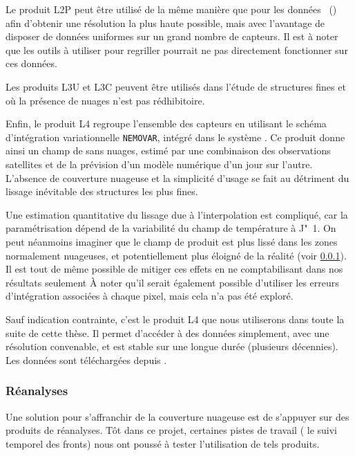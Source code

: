 Le produit L2P peut être utilisé de la même manière que pour les données ~() afin d'obtenir une résolution la plus haute possible, mais avec l'avantage de disposer de données uniformes sur un grand nombre de capteurs.
Il est à noter que les outils à utiliser pour regriller pourrait ne pas directement fonctionner sur ces données.

Les produits L3U et L3C peuvent être utilisés dans l'étude de structures fines et où la présence de nuages n'est pas rédhibitoire.

Enfin, le produit L4 regroupe l'ensemble des capteurs en utilisant le schéma d'intégration variationnelle \verb|NEMOVAR|, intégré dans le système  \parencite{good_2020}.
Ce produit donne ainsi un champ de  sans nuages, estimé par une combinaison des observations satellites et de la prévision d'un modèle numérique d'un jour sur l'autre.
L'absence de couverture nuageuse et la simplicité d'usage se fait au détriment du lissage inévitable des structures les plus fines.

Une estimation quantitative du lissage due à l'interpolation est compliqué, car la paramétrisation dépend de la variabilité du champ de température à J"~1.
On peut néanmoins imaginer que le champ de  produit est plus lissé dans les zones normalement nuageuses, et potentiellement plus éloigné de la réalité (voir \cref{sec:donnees-sst-reanalyses}).
Il est tout de même possible de mitiger ces effets en ne comptabilisant dans nos résultats seulement
À noter qu'il serait également possible d'utiliser les erreurs d'intégration associées à chaque pixel, mais cela n'a pas été exploré.

Sauf indication contrainte, c'est le produit L4 que nous utiliserons dans toute la suite de cette thèse.
Il permet d'accéder à des données  simplement, avec une résolution convenable, et est stable sur une longue durée (plusieurs décennies).
Les données sont téléchargées depuis .

\subsubsection{Réanalyses}
\label{sec:donnees-sst-reanalyses}

Une solution pour s'affranchir de la couverture nuageuse est de s'appuyer sur des produits de réanalyses.
Tôt dans ce projet, certaines pistes de travail ( le suivi temporel des fronts) nous ont poussé à tester l'utilisation de tels produits.

